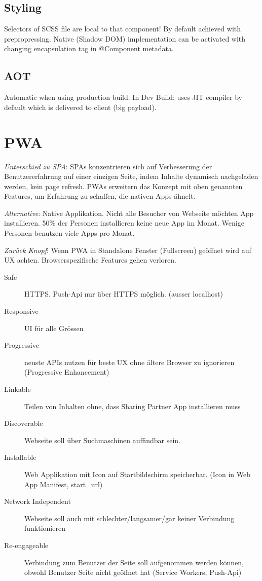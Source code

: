 \begin{multicols*}{2}
\subsection{Styling}
Selectors of SCSS file are local to that component! By default achieved with prepropressing. Native (Shadow DOM) implementation can be activated with changing encapsulation tag in @Component metadata.

\subsection{AOT}
Automatic when using production build. In Dev Build: uses JIT compiler by default which is delivered to client (big payload).

\section{PWA}
\textit{Unterschied zu SPA}: SPAs konzentrieren sich auf Verbesserung der
Benutzererfahrung auf einer einzigen Seite, indem Inhalte dynamisch nachgeladen
werden, kein page refresh. PWAs erweitern das Konzept mit oben genannten
Features, um Erfahrung zu schaffen, die nativen Apps ähnelt.

\textit{Alternative}: Native Applikation. Nicht alle Besucher von Webseite möchten App installieren. 50\% der Personen installieren keine neue App im Monat. Wenige Personen benutzen viele Apps pro Monat.

\textit{Zurück Knopf}: Wenn PWA in Standalone Fenster (Fullscreen) geöffnet wird auf UX achten. Browserspezifische Features gehen verloren.

\begin{description}
    \item[Safe] HTTPS. Push-Api nur über HTTPS möglich. (ausser localhost)
    \item[Responsive] UI für alle Grössen
    \item[Progressive] neuste APIs nutzen für beste UX ohne ältere Browser zu ignorieren (Progressive Enhancement)
    \item[Linkable] Teilen von Inhalten ohne, dass Sharing Partner App installieren muss
    \item[Discoverable] Webseite soll über Suchmaschinen auffindbar sein.
    \item[Installable] Web Applikation mit Icon auf Startbildschirm speicherbar. (Icon in Web App Manifest, start\_url)
    \item[Network Independent] Webseite soll auch mit schlechter/langsamer/gar keiner Verbindung funktionieren
    \item[Re-engageable] Verbindung zum Benutzer der Seite soll aufgenommen werden können, obwohl Benutzer Seite nicht geöffnet hat (Service Workers, Push-Api)
\end{description}


\end{multicols*}
